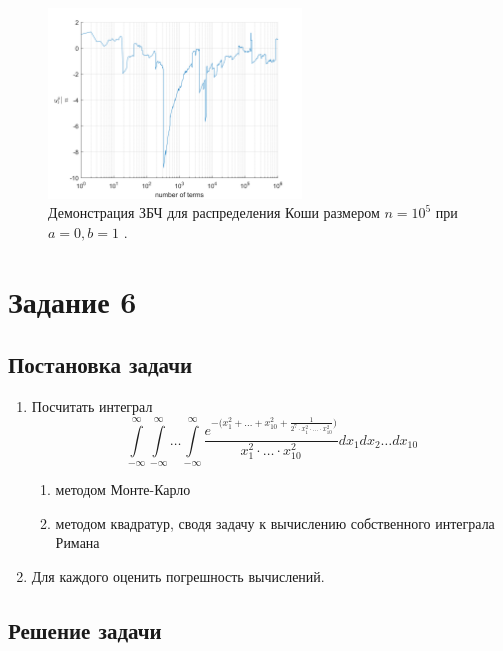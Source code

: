 \documentclass[oneside, final, 12pt]{article}
\begin{document}
	\begin{figure}[h!]
		\centering
		\includegraphics[width=0.6\textwidth]{../code/Task_5/pict/LLN_cauchy_ex.png}
		\caption{Демонстрация ЗБЧ для распределения Коши размером $n=10^5$ при $a=0, b=1$ .}
    \end{figure}
	
\section{Задание 6}

\subsection{Постановка задачи}
    \begin{enumerate} 
        \item Посчитать интеграл
        $$ 
            \int\limits_{-\infty}^{\infty} \int\limits_{-\infty}^{\infty}
                \ldots \int\limits_{-\infty}^{\infty}
            \frac{e^{-\Big(x_1^2+\ldots+ x_{10}^2 
                                + \frac{1}{2^7\cdot x_1^2 \cdot \ldots \cdot x_{10}^2 }\Big)}}
                    {x_1^2 \cdot \ldots \cdot x_{10}^2}
            d x_1 d x_2 \ldots d x_{10}
        $$
            \begin{enumerate}
                \item методом Монте-Карло
                \item методом квадратур, сводя задачу к вычислению собственного интеграла Римана
            \end{enumerate} 
        \item Для каждого оценить погрешность вычислений. 
    \end{enumerate}
\subsection{Решение задачи}
\end{document}

